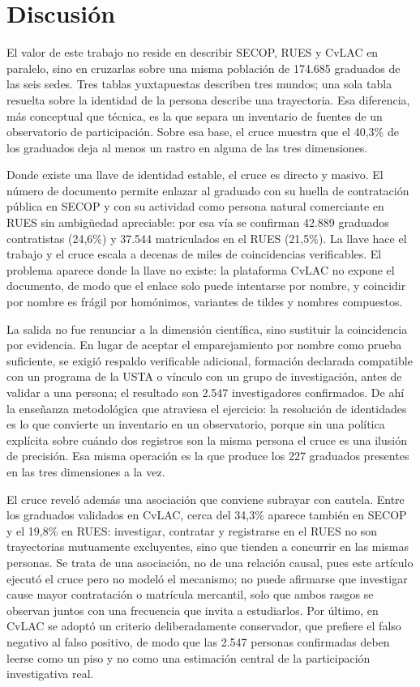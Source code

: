 \section{Discusión}

El valor de este trabajo no reside en describir SECOP, RUES y CvLAC en paralelo, sino en cruzarlas sobre una misma población de 174.685 graduados de las seis sedes. Tres tablas yuxtapuestas describen tres mundos; una sola tabla resuelta sobre la identidad de la persona describe una trayectoria. Esa diferencia, más conceptual que técnica, es la que separa un inventario de fuentes de un observatorio de participación. Sobre esa base, el cruce muestra que el 40,3\% de los graduados deja al menos un rastro en alguna de las tres dimensiones.

Donde existe una llave de identidad estable, el cruce es directo y masivo. El número de documento permite enlazar al graduado con su huella de contratación pública en SECOP y con su actividad como persona natural comerciante en RUES sin ambigüedad apreciable: por esa vía se confirman 42.889 graduados contratistas (24,6\%) y 37.544 matriculados en el RUES (21,5\%). La llave hace el trabajo y el cruce escala a decenas de miles de coincidencias verificables. El problema aparece donde la llave no existe: la plataforma CvLAC no expone el documento, de modo que el enlace solo puede intentarse por nombre, y coincidir por nombre es frágil por homónimos, variantes de tildes y nombres compuestos.

La salida no fue renunciar a la dimensión científica, sino sustituir la coincidencia por evidencia. En lugar de aceptar el emparejamiento por nombre como prueba suficiente, se exigió respaldo verificable adicional, formación declarada compatible con un programa de la USTA o vínculo con un grupo de investigación, antes de validar a una persona; el resultado son 2.547 investigadores confirmados. De ahí la enseñanza metodológica que atraviesa el ejercicio: la resolución de identidades es lo que convierte un inventario en un observatorio, porque sin una política explícita sobre cuándo dos registros son la misma persona el cruce es una ilusión de precisión. Esa misma operación es la que produce los 227 graduados presentes en las tres dimensiones a la vez.

El cruce reveló además una asociación que conviene subrayar con cautela. Entre los graduados validados en CvLAC, cerca del 34,3\% aparece también en SECOP y el 19,8\% en RUES: investigar, contratar y registrarse en el RUES no son trayectorias mutuamente excluyentes, sino que tienden a concurrir en las mismas personas. Se trata de una asociación, no de una relación causal, pues este artículo ejecutó el cruce pero no modeló el mecanismo; no puede afirmarse que investigar cause mayor contratación o matrícula mercantil, solo que ambos rasgos se observan juntos con una frecuencia que invita a estudiarlos. Por último, en CvLAC se adoptó un criterio deliberadamente conservador, que prefiere el falso negativo al falso positivo, de modo que las 2.547 personas confirmadas deben leerse como un piso y no como una estimación central de la participación investigativa real.

